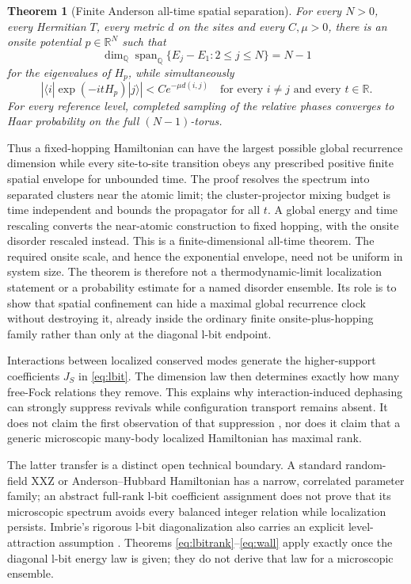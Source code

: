 \documentclass[10pt]{article}
\newtheorem{theorem}{Theorem}
\theoremstyle{definition}
\newcommand{\Q}{\mathbb Q}
\newcommand{\R}{\mathbb R}
\newcommand{\spanQ}{\operatorname{span}_{\Q}}
\begin{document}
\begin{theorem}[Finite Anderson all-time spatial separation]
\label{thm:anderson-separation}
For every \(N>0\), every Hermitian \(T\), every metric \(d\) on the sites
and every \(C,\mu>0\), there is an onsite potential \(p\in\R^N\) such that
\[
 \dim_{\Q}\spanQ\{E_j-E_1:2\le j\le N\}=N-1
 \label{eq:anderson-fullrank}
\]
for the eigenvalues of \(H_p\), while simultaneously
\[
 \left|\langle i|\exp(-itH_p)|j\rangle\right|
 < C e^{-\mu d(i,j)}
 \quad\text{for every }i\ne j
 \text{ and every }t\in\R .
 \label{eq:anderson-nonexit}
\]
For every reference level, completed sampling of the relative phases
converges to Haar probability on the full \((N-1)\)-torus.
\end{theorem}

Thus a fixed-hopping Hamiltonian can have the largest possible global
recurrence dimension while every site-to-site transition obeys any
prescribed positive finite spatial envelope for unbounded time. The proof
resolves the spectrum into separated clusters near the atomic limit; the
cluster-projector mixing budget is time independent and bounds the
propagator for all \(t\). A global energy and time rescaling converts the
near-atomic construction to fixed hopping, with the onsite disorder
rescaled instead. This is a finite-dimensional all-time theorem. The
required onsite scale, and hence the exponential envelope, need not be
uniform in system size. The theorem is therefore not a thermodynamic-limit
localization statement or a probability estimate for a named disorder
ensemble. Its role is to show that spatial confinement can hide a maximal
global recurrence clock without destroying it, already inside the
ordinary finite onsite-plus-hopping family rather than only at the
diagonal l-bit endpoint.

Interactions between localized conserved modes generate the higher-support
coefficients \(J_S\) in \eqref{eq:lbit}. The dimension law then determines
exactly how many free-Fock relations they remove. This explains why
interaction-induced dephasing can strongly suppress revivals while
configuration transport remains absent. It does not claim the first
observation of that suppression
\cite{VasseurParameswaranMoore2015}, nor does it claim that a generic
microscopic many-body localized Hamiltonian has maximal rank.

The latter transfer is a distinct open technical boundary. A standard
random-field XXZ or Anderson--Hubbard Hamiltonian has a narrow, correlated
parameter family; an abstract full-rank l-bit coefficient assignment does
not prove that its microscopic spectrum avoids every balanced integer
relation while localization persists. Imbrie's rigorous l-bit
diagonalization also carries an explicit level-attraction assumption
\cite{Imbrie2016}. Theorems \eqref{eq:lbitrank}--\eqref{eq:wall} apply
exactly once the diagonal l-bit energy law is given; they do not derive that
law for a microscopic ensemble.
\end{document}

